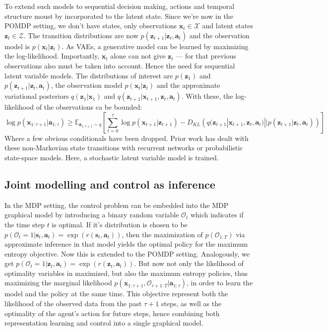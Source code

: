 \documentclass{article}
\begin{document}
To extend such models to sequential decision making,
actions and temporal structure moust by incorporated to the latent state.
Since we're now in the POMDP setting, we don't have states, only
observations $ \bm{x}_{t} \in \mathcal{X}  $ and latent states
$ \bm{z}_{t} \in \mathcal{Z}  $.
The transition distributions are now $ p (\bm{z}_{t+1}| \bm{z}_{t}, \bm{a}_{t})  $
and the observation model is $ p (\bm{x}_{t} | \bm{z}_{t})  $.
As VAEs, a generative model can be learned by maximizing the log-likelihood.
Importantly, $ \bm{x}_{t}  $ alone can not give $ \bm{z}_{t}  $ ---
for that previous observations also must be taken into account.
Hence the need for sequential latent variable models.
The distributions of interest are $ p (\bm{z}_{1})  $ and
$ p (\bm{z}_{t+1}| \bm{z}_{t}, \bm{a}_{t})  $,
the observation model $ p (\bm{x}_{t} | \bm{z}_{t})  $
and the approximate variational posteriors
$ q (\bm{z}_{1}| \bm{x}_{1})  $ and
$ q (\bm{z}_{t+1}| \bm{x}_{t+1}, \bm{z}_{t}, \bm{a}_{t})  $.
With these, the log-likelihood of the observations ca be bounded:
\begin{equation}
\log p (\bm{x}_{1:\tau+1} | \bm{a}_{1:\tau}) \geq
\mathbb{E}_{ \bm{z}_{1:\tau +1} \sim q }
\left[ 
		\sum_{t=0}^{\tau} \log p (\bm{x}_{t+1}|\bm{z}_{t+1}) -
		D_{ KL } \left( 
q (\bm{z}_{t+1}|\bm{x}_{t+1}, \bm{z}_{t}, \bm{a}_{t}) 
|| p (\bm{z}_{t+1}|\bm{z}_{t},\bm{a}_{t})
		\right) 
\right] 
\end{equation}
Where a few obvious conditionals have been dropped.
Prior work has dealt with these non-Markovian state transitions
with recurrent networks or probabilistic state-space models.
Here, a stochastic latent variable model is trained.

\subsection{Joint modelling and control as inference}
In the MDP setting, the control problem can be embedded into the MDP
graphical model by introducing a binary random variable $ \mathcal{O}_{ t }  $
which indicates if the time step $ t  $ is optimal.
If it's distribution is chosen to be $ p (\mathcal{O}_{ t } =1 | \bm{s}_{t}, \bm{a}_{t} )
= \exp (r (\bm{s}_{t}, \bm{a}_{t} ))$, then the maximization
of $ p (\mathcal{O}_{ 1:T })  $ via approximate inference in that model
yields the optimal policy for the maximum entropy objective.
Now this is extended to the POMDP setting.
Analogously, we get
$ p (\mathcal{O}_{ t } =1 | \bm{z}_{t}, \bm{a}_{t} ) = \exp (r (\bm{z}_{t}, \bm{a}_{t} ))$.
But now not only the likelihood of optimality variables in maximized,
but also the maximum entropy policies,
thus maximizing the marginal likelihood 
$ p (\bm{x}_{1:\tau+1}, \mathcal{O}_{ \tau+1:T }|\bm{a}_{1:\tau})  $,
in order to learn the model and the policy at the same time.
This objective represent both the likelihood of the observed data
from the past $ \tau + 1  $ steps,
as well as the optimality of the agent's action for future steps, hence
combining both representation learning and control into a single graphical model.
\end{document}
